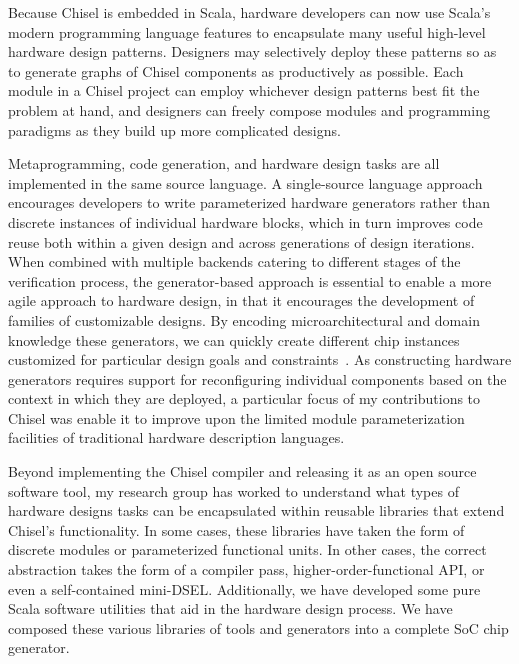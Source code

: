 Because Chisel is embedded in Scala, hardware developers can now use Scala's modern programming language features to encapsulate many useful high-level hardware design patterns.
Designers may selectively deploy these patterns so as to generate graphs of Chisel components as productively as possible.
Each module in a Chisel project can employ whichever design patterns best fit the problem at hand, and designers can freely compose modules and programming paradigms as they build up more complicated designs.

Metaprogramming, code generation, and hardware design tasks are all implemented in the same source language.
A single-source language approach encourages developers to write parameterized hardware generators rather than discrete instances of individual hardware blocks,
which in turn improves code reuse both within a given design and across generations of design iterations.
When combined with multiple backends catering to different stages of the verification process, the generator-based approach is essential to enable a more agile approach to hardware design,
in that it encourages the development of families of customizable designs.  
By encoding microarchitectural and domain knowledge these generators, we can quickly create different
chip instances customized for particular design goals and constraints~\cite{shacham-micro10}.  
As constructing hardware generators requires
support for reconfiguring individual components based on the context
in which they are deployed, a particular focus of my contributions to Chisel was enable it to improve
upon the limited module parameterization facilities of traditional
hardware description languages.

Beyond implementing the Chisel compiler and releasing it as an open source software tool, my research group has worked to understand what types of hardware designs tasks can be encapsulated within reusable libraries that extend Chisel's functionality.
In some cases, these libraries have taken the form of discrete modules or parameterized functional units.
In other cases, the correct abstraction takes the form of a compiler pass, higher-order-functional API, or even a self-contained mini-DSEL.
Additionally, we have developed some pure Scala software utilities that aid in the hardware design process.
We have composed these various libraries of tools and generators into a complete SoC chip generator.

